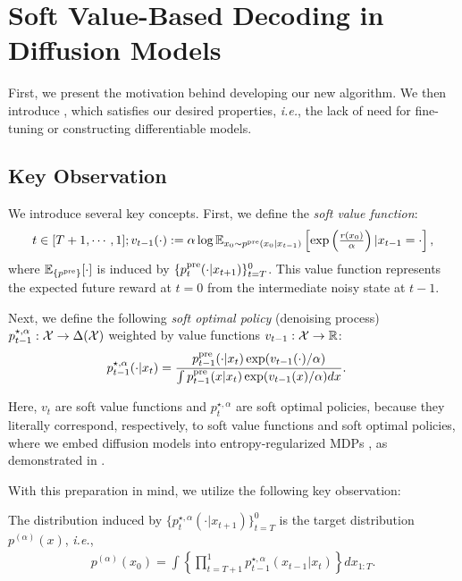 \vspace{-2mm}
\section{Soft Value-Based Decoding in Diffusion Models}
\vspace{-2mm}

First, we present the motivation behind developing our new algorithm. We then introduce \alg, which satisfies our desired properties, \textit{i.e.}, the lack of need for fine-tuning or constructing differentiable models.


\vspace{-2mm}
\subsection{Key Observation}
\vspace{-2mm}

We introduce several key concepts. First, we define the \emph{soft value function}:
\begin{align*}
   \textstyle  t \in [T+1,\cdots,1]; v_{t-1}(\cdot ):=\alpha \log \mathbb{E}_{x_0 \sim p^{\mathrm{pre}}(x_0|x_{t-1})}\left [\exp\left (\frac{r(x_0)}{\alpha} \right)|x_{t-1}=\cdot \right ], 
\end{align*}
where $\mathbb{E}_{\{p^{\mathrm{pre}}\}}[\cdot]$ is induced by $\{ p^{\mathrm{pre}}_{t}(\cdot|x_{t+1})\}_{t=T}^0$. This value function represents the expected future reward at $t=0$ from the intermediate noisy state at $t-1$. 

Next, we define the following \emph{soft optimal policy} (denoising process) $p^{\star,\alpha}_{t-1}:\mathcal{X}  \to \Delta(\mathcal{X})$ weighted by value functions $v_{t-1}:\mathcal{X} \to \mathbb{R}$: 
\begin{align*}
 \textstyle  p^{\star,\alpha}_{t-1}(\cdot|x_{t})&=\frac{p^{\mathrm{pre}}_{t-1}(\cdot |x_{t})\exp(v_{t-1}(\cdot)/\alpha)}{\int p^{\mathrm{pre}}_{t-1}(x|x_{t})\exp(v_{t-1}(x)/\alpha)dx }. 
\end{align*}


Here, $v_t$ are soft value functions and $p^{\star,\alpha}_t$ are soft optimal policies, because they literally correspond, respectively, to soft value functions and soft optimal policies, where we embed diffusion models into entropy-regularized MDPs \citep{geist2019theory}, as demonstrated in \citet{uehara2024understanding}.

With this preparation in mind, we utilize the following key observation: 
\begin{theorem}\label{thm:key}
The distribution induced by $\{ p^{\star,\alpha}_t(\cdot|x_{t+1})\}_{t=T}^0$ is the target distribution $p^{(\alpha)}(x)$, \textit{i.e.}, 
\begin{align*} \textstyle 
    p^{(\alpha)}(x_0) = \int \left\{ \prod_{t=T+1}^1 p^{\star,\alpha}_{t-1}(x_{t-1}|x_t)\right \}d x_{1:T}.
\end{align*}
\end{theorem}

